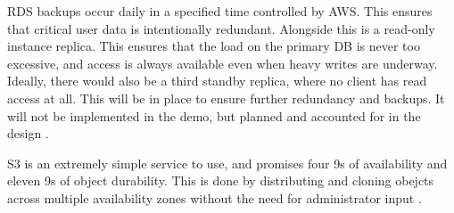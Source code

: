 RDS backups occur daily in a specified time controlled by AWS. This ensures that critical user data is intentionally redundant. Alongside this is a read-only instance replica. This ensures that the load on the primary DB is never too excessive, and access is always available even when heavy writes are underway. Ideally, there would also be a third standby replica, where no client has read access at all. This will be in place to ensure further redundancy and backups. It will not be implemented in the demo, but planned and accounted for in the design \autocite{amazonwebservicesEncryptingAmazonRDS2023}.

S3 is an extremely simple service to use, and promises four 9s of availability and eleven 9s of object durability. This is done by distributing and cloning obejcts across multiple availability zones without the need for administrator input \autocite{amazonwebservicesAmazonSimpleStorage2023}.
